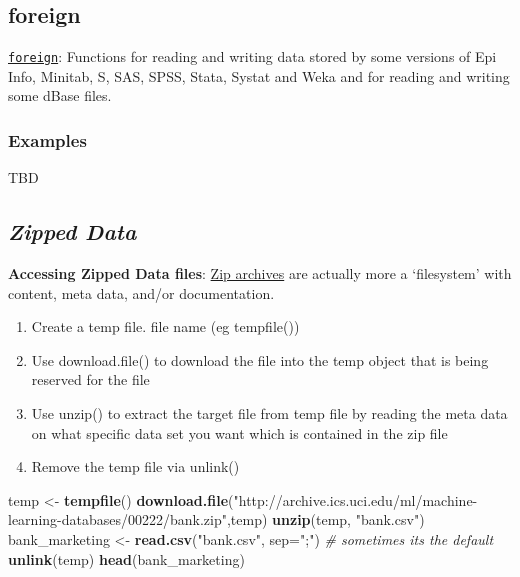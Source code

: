 \documentclass[]{book}
\newenvironment{Shaded}{\begin{snugshade}}{\end{snugshade}}
\newcommand{\KeywordTok}[1]{\textcolor[rgb]{0.13,0.29,0.53}{\textbf{{#1}}}}
\newcommand{\DataTypeTok}[1]{\textcolor[rgb]{0.13,0.29,0.53}{{#1}}}
\newcommand{\StringTok}[1]{\textcolor[rgb]{0.31,0.60,0.02}{{#1}}}
\newcommand{\CommentTok}[1]{\textcolor[rgb]{0.56,0.35,0.01}{\textit{{#1}}}}
\newcommand{\NormalTok}[1]{{#1}}
\providecommand{\tightlist}{%
  \setlength{\itemsep}{0pt}\setlength{\parskip}{0pt}}
\begin{document}
\subsection{\texorpdfstring{\textbf{foreign }}{foreign }}\label{foreign}

\href{https://CRAN.R-project.org/package=foreign}{\texttt{foreign}}:
Functions for reading and writing data stored by some versions of Epi
Info, Minitab, S, SAS, SPSS, Stata, Systat and Weka and for reading and
writing some dBase files.

\subsubsection{\texorpdfstring{\textbf{Examples
}}{Examples }}\label{examples-10}

TBD

\subsection{\texorpdfstring{\textbf{\emph{Zipped Data}
}}{Zipped Data }}\label{zipped-data}

\textbf{Accessing Zipped Data files}:
\href{https://en.wikipedia.org/wiki/Zip_(file_format)}{Zip archives} are
actually more a `filesystem' with content, meta data, and/or
documentation.

\begin{enumerate}
\def\labelenumi{\arabic{enumi}.}
\tightlist
\item
  Create a temp file. file name (eg tempfile())
\item
  Use download.file() to download the file into the temp object that is
  being reserved for the file
\item
  Use unzip() to extract the target file from temp file by reading the
  meta data on what specific data set you want which is contained in the
  zip file
\item
  Remove the temp file via unlink()
\end{enumerate}

\begin{Shaded}
\begin{Highlighting}[]
\NormalTok{temp <-}\StringTok{ }\KeywordTok{tempfile}\NormalTok{()}
\KeywordTok{download.file}\NormalTok{(}\StringTok{"http://archive.ics.uci.edu/ml/machine-learning-databases/00222/bank.zip"}\NormalTok{,temp)}
\KeywordTok{unzip}\NormalTok{(temp, }\StringTok{"bank.csv"}\NormalTok{)}
\NormalTok{bank_marketing <-}\StringTok{ }\KeywordTok{read.csv}\NormalTok{(}\StringTok{"bank.csv"}\NormalTok{, }\DataTypeTok{sep=}\StringTok{";"}\NormalTok{) }\CommentTok{# sometimes its the default}
\KeywordTok{unlink}\NormalTok{(temp)}
\KeywordTok{head}\NormalTok{(bank_marketing)}
\end{Highlighting}
\end{Shaded}
\end{document}
